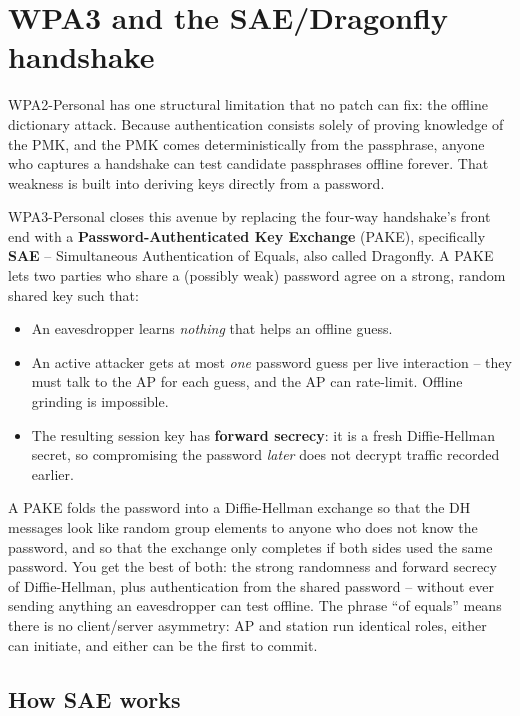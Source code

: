\section{WPA3 and the SAE/Dragonfly handshake}

WPA2-Personal has one structural limitation that no patch can fix: the offline
dictionary attack. Because authentication consists solely of proving knowledge of the
PMK, and the PMK comes deterministically from the passphrase, anyone who captures
a handshake can test candidate passphrases offline forever. That weakness is built
into deriving keys directly from a password.

WPA3-Personal closes this avenue by replacing the four-way handshake's front end
with a \textbf{Password-Authenticated Key Exchange} (PAKE), specifically
\textbf{SAE} -- Simultaneous Authentication of Equals, also called Dragonfly. A
PAKE lets two parties who share a (possibly weak) password agree on a strong,
random shared key such that:
\begin{itemize}
  \item An eavesdropper learns \emph{nothing} that helps an offline guess.
  \item An active attacker gets at most \emph{one} password guess per live
        interaction -- they must talk to the AP for each guess, and the AP can
        rate-limit. Offline grinding is impossible.
  \item The resulting session key has \textbf{forward secrecy}: it is a fresh
        Diffie-Hellman secret, so compromising the password \emph{later} does not
        decrypt traffic recorded earlier.
\end{itemize}

\begin{intuitionbox}
A PAKE folds the password into a Diffie-Hellman exchange so that
the DH messages look like random group elements to anyone who does not know the
password, and so that the exchange only completes if both sides used the same
password. You get the best of both: the strong randomness and forward secrecy of
Diffie-Hellman, plus authentication from the shared password -- without ever
sending anything an eavesdropper can test offline. The phrase ``of equals'' means
there is no client/server asymmetry: AP and station run identical roles, either
can initiate, and either can be the first to commit.
\end{intuitionbox}

\subsection{How SAE works}

